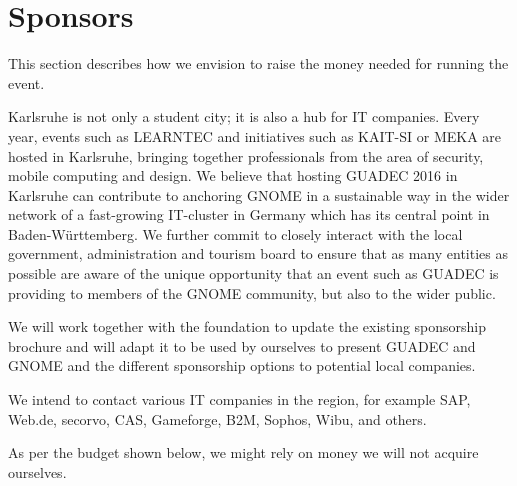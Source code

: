 \newpage


\vspace*{8.8cm}

\section{Sponsors}

This section describes how we envision to raise the money needed for running the event.

Karlsruhe is not only a student city; it is also a hub for IT companies. Every year, events such as LEARNTEC and initiatives such as KAIT-SI or MEKA are hosted in Karlsruhe, bringing together professionals from the area of security, mobile computing and design.
We believe that hosting GUADEC 2016 in Karlsruhe can contribute to anchoring GNOME in a sustainable way in the wider network of a fast-growing IT-cluster in Germany which has its central point in Baden-Württemberg.
We further commit to closely interact with the local government, administration and tourism board to ensure that as many entities as possible are aware of the unique opportunity that an event such as GUADEC is providing to members of the GNOME community, but also to the wider public.  

We will work together with the foundation to update the existing sponsorship
brochure and will adapt it to be used by ourselves to present GUADEC and GNOME
and the different sponsorship options to potential local companies.

We intend to contact various IT companies in the region, for example SAP, Web.de, secorvo, 
CAS, Gameforge, B2M, 
Sophos, Wibu,
and others.


As per the budget shown below, we might rely on money we will not acquire ourselves.
